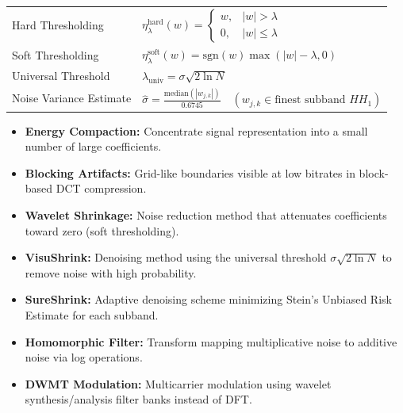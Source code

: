 \documentclass[12pt,a4paper]{article}
\renewcommand{\arraystretch}{1.45}
\begin{document}
\begin{tcolorbox}[formulabox, title={\textbf{Key Equations}}]
\renewcommand{\arraystretch}{1.35}
\begin{tabularx}{\linewidth}{B{5.0cm} X}
Hard Thresholding & $\eta_\lambda^{\text{hard}}(w) = \begin{cases} w, & |w| > \lambda \\ 0, & |w| \le \lambda \end{cases}$ \\[12pt]
Soft Thresholding & $\eta_\lambda^{\text{soft}}(w) = \text{sgn}(w)\max(|w| - \lambda, 0)$ \\[4pt]
Universal Threshold & $\lambda_{\text{univ}} = \sigma \sqrt{2 \ln N}$ \\[4pt]
Noise Variance Estimate & $\hat{\sigma} = \frac{\text{median}(|w_{j,k}|)}{0.6745} \quad (w_{j,k} \in \text{finest subband } HH_1)$
\end{tabularx}
\end{tcolorbox}

\begin{tcolorbox}[defbox, title={\textbf{One-Line Definitions}}]
\begin{itemize}[leftmargin=*, itemsep=3.5pt]
  \item \textbf{Energy Compaction:} Concentrate signal representation into a small number of large coefficients.
  \item \textbf{Blocking Artifacts:} Grid-like boundaries visible at low bitrates in block-based DCT compression.
  \item \textbf{Wavelet Shrinkage:} Noise reduction method that attenuates coefficients toward zero (soft thresholding).
  \item \textbf{VisuShrink:} Denoising method using the universal threshold $\sigma \sqrt{2 \ln N}$ to remove noise with high probability.
  \item \textbf{SureShrink:} Adaptive denoising scheme minimizing Stein's Unbiased Risk Estimate for each subband.
  \item \textbf{Homomorphic Filter:} Transform mapping multiplicative noise to additive noise via log operations.
  \item \textbf{DWMT Modulation:} Multicarrier modulation using wavelet synthesis/analysis filter banks instead of DFT.
\end{itemize}
\end{tcolorbox}
\end{document}
